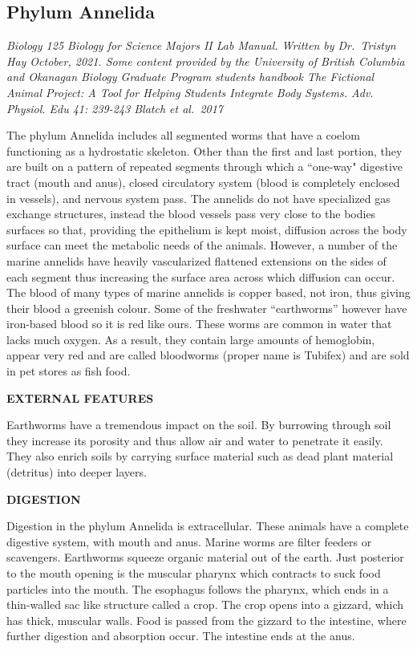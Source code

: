 \documentclass[
]{book}
\begin{document}
\hypertarget{phylum-annelida}{%
\subsection*{Phylum Annelida}\label{phylum-annelida}}

\emph{Biology 125 Biology for Science Majors II Lab Manual. Written by Dr.~Tristyn Hay October, 2021. Some content provided by the University of British Columbia and Okanagan Biology Graduate Program students handbook The Fictional Animal Project: A Tool for Helping Students Integrate Body Systems. Adv. Physiol. Edu 41: 239-243 Blatch et al.~2017}

The phylum Annelida includes all segmented worms that have a coelom functioning as a hydrostatic skeleton. Other than the first and last portion, they are built on a pattern of repeated segments through which a ``one-way" digestive tract (mouth and anus), closed circulatory system (blood is completely enclosed in vessels), and nervous system pass. The annelids do not have specialized gas exchange structures, instead the blood vessels pass very close to the bodies surfaces so that, providing the epithelium is kept moist, diffusion across the body surface can meet the metabolic needs of the animals. However, a number of the marine annelids have heavily vascularized flattened extensions on the sides of each segment thus increasing the surface area across which diffusion can occur. The blood of many types of marine annelids is copper based, not iron, thus giving their blood a greenish colour. Some of the freshwater ``earthworms'' however have iron-based blood so it is red like ours. These worms are common in water that lacks much oxygen. As a result, they contain large amounts of hemoglobin, appear very red and are called bloodworms (proper name is Tubifex) and are sold in pet stores as fish food.

\textbf{EXTERNAL FEATURES}

Earthworms have a tremendous impact on the soil. By burrowing through soil they increase its porosity and thus allow air and water to penetrate it easily. They also enrich soils by carrying surface material such as dead plant material (detritus) into deeper layers.

\textbf{DIGESTION}

Digestion in the phylum Annelida is extracellular. These animals have a complete digestive system, with mouth and anus. Marine worms are filter feeders or scavengers. Earthworms squeeze organic material out of the earth. Just posterior to the mouth opening is the muscular pharynx which contracts to suck food particles into the mouth. The esophagus follows the pharynx, which ends in a thin-walled sac like structure called a crop. The crop opens into a
gizzard, which has thick, muscular walls. Food is passed from the gizzard to the intestine, where
further digestion and absorption occur. The intestine ends at the anus.
\end{document}
